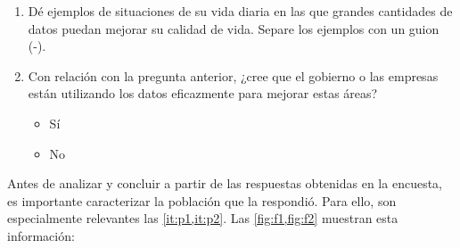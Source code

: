 \documentclass[12pt,a4paper]{article}
\begin{document}
\begin{enumerate}
    \item Dé ejemplos de situaciones de su vida diaria en las que grandes cantidades de datos puedan
     mejorar su calidad de vida. Separe los ejemplos con un guion (-). \label{it:p10}
    \item Con relación con la pregunta anterior, ¿cree que el gobierno o las empresas están utilizando 
    los datos eficazmente para mejorar estas áreas? \label{it:p11}
    \begin{itemize}
        \item Sí
        \item No
    \end{itemize}
\end{enumerate}

Antes de analizar y concluir a partir de las respuestas obtenidas en la encuesta, 
es importante caracterizar la población que la respondió. Para ello, son especialmente relevantes las \cref{it:p1,it:p2}. 
Las \cref{fig:f1,fig:f2} muestran esta información:
\end{document}
